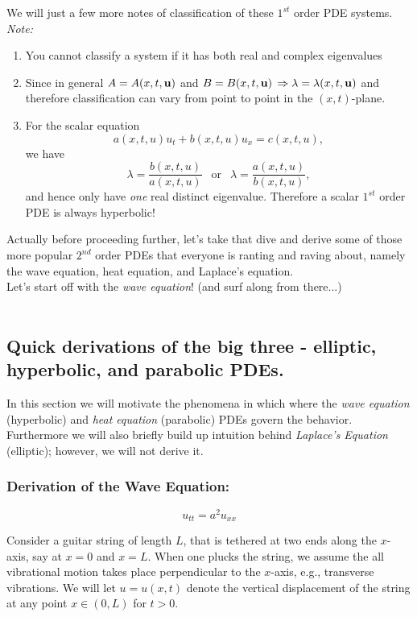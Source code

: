 We will just a few more notes of classification of these $1^{st}$ order PDE systems.  \emph{Note:}
\begin{enumerate}
\item You cannot classify a system if it has both real and complex eigenvalues
\item Since in general $A=A(x,t,{\bf{u}})$ and $B=B(x,t,{\bf{u}})$ $\Rightarrow \lambda = \lambda(x,t,{\bf{u}})$ and therefore classification can vary from point to point in the $(x,t)$-plane.
\item For the scalar equation $$a(x,t,u) u_t + b(x,t,u) u_x = c(x,t,u),$$
we have $$\lambda = \frac{b(x,t,u)}{a(x,t,u)}\ \ \mbox{ or } \ \ \lambda = \frac{a(x,t,u)}{b(x,t,u)},$$ 
and hence only have \emph{one} real distinct eigenvalue. Therefore a scalar $1^{st}$ order PDE is always hyperbolic!
\end{enumerate}


Actually before proceeding further, let's take that dive and derive some of those more popular $2^{nd}$ order PDEs that everyone is ranting and raving about, namely the wave equation, heat equation, and Laplace's equation.\\

Let's start off with the \emph{wave equation}! (and surf along from there...) \\ \\ 

%
%
\subsection{Quick derivations of the big three - elliptic, hyperbolic, and parabolic PDEs.}

In this section we will motivate the phenomena in which where the \emph{wave equation} (hyperbolic) and \emph{heat equation} (parabolic) PDEs govern the behavior. Furthermore we will also briefly build up intuition behind \emph{Laplace's Equation} (elliptic); however, we will not derive it. 

%
%
\subsubsection{Derivation of the Wave Equation:} $$u_{tt} = a^2 u_{xx}$$

Consider a guitar string of length $L$, that is tethered at two ends along the $x$-axis, say at $x=0$ and $x=L.$ When one plucks the string, we assume the all vibrational motion takes place perpendicular to the $x$-axis, e.g., transverse vibrations. We will let $u=u(x,t)$ denote the vertical displacement of the string at any point $x\in(0,L)$ for $t>0$.\\

